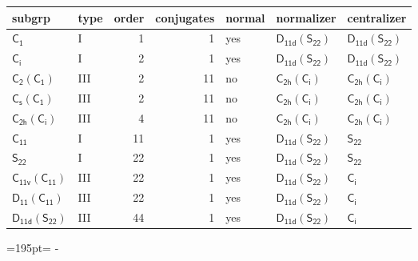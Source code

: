 \documentclass[10pt,a4paper]{article}
\newcommand{\needspace}[1]{\par\penalty-100\begingroup\dimen0=#1\relax\dimen2=\pagegoal
  \advance\dimen2-\pagetotal\ifdim\dimen0>\dimen2\relax\ifdim\dimen2>0pt\vfil\break\fi\fi
  \endgroup}
\numberwithin{equation}{section}
\newcommand{\grp}[1]{\mathsf{#1}}
\begin{document}
{\small\begin{longtable}{@{}llrrlll@{}}\toprule
subgrp & type & order & conjugates & normal & normalizer & centralizer\\\midrule\endhead
\bottomrule\endfoot\endlastfoot
\href{../../../rotation/data/pdf/C1.pdf}{$\grp{C_{1}}$} & I & 1 & 1 & yes & \href{D11d-S22.pdf}{$\grp{D_{11d}}(\grp{S_{22}})$} & \href{D11d-S22.pdf}{$\grp{D_{11d}}(\grp{S_{22}})$}\\*
\href{../../../rotation/data/pdf/S2.pdf}{$\grp{C_{i}}$} & I & 2 & 1 & yes & \href{D11d-S22.pdf}{$\grp{D_{11d}}(\grp{S_{22}})$} & \href{D11d-S22.pdf}{$\grp{D_{11d}}(\grp{S_{22}})$}\\*
\href{C2-C1.pdf}{$\grp{C_{2}}(\grp{C_{1}})$} & III & 2 & 11 & no & \href{C2h-S2.pdf}{$\grp{C_{2h}}(\grp{C_{i}})$} & \href{C2h-S2.pdf}{$\grp{C_{2h}}(\grp{C_{i}})$}\\*
\href{C1v-C1.pdf}{$\grp{C_{s}}(\grp{C_{1}})$} & III & 2 & 11 & no & \href{C2h-S2.pdf}{$\grp{C_{2h}}(\grp{C_{i}})$} & \href{C2h-S2.pdf}{$\grp{C_{2h}}(\grp{C_{i}})$}\\*
\href{C2h-S2.pdf}{$\grp{C_{2h}}(\grp{C_{i}})$} & III & 4 & 11 & no & \href{C2h-S2.pdf}{$\grp{C_{2h}}(\grp{C_{i}})$} & \href{C2h-S2.pdf}{$\grp{C_{2h}}(\grp{C_{i}})$}\\*
\href{../../../rotation/data/pdf/C11.pdf}{$\grp{C_{11}}$} & I & 11 & 1 & yes & \href{D11d-S22.pdf}{$\grp{D_{11d}}(\grp{S_{22}})$} & \href{../../../rotation/data/pdf/S22.pdf}{$\grp{S_{22}}$}\\*
\href{../../../rotation/data/pdf/S22.pdf}{$\grp{S_{22}}$} & I & 22 & 1 & yes & \href{D11d-S22.pdf}{$\grp{D_{11d}}(\grp{S_{22}})$} & \href{../../../rotation/data/pdf/S22.pdf}{$\grp{S_{22}}$}\\*
\href{C11v-C11.pdf}{$\grp{C_{11v}}(\grp{C_{11}})$} & III & 22 & 1 & yes & \href{D11d-S22.pdf}{$\grp{D_{11d}}(\grp{S_{22}})$} & \href{../../../rotation/data/pdf/S2.pdf}{$\grp{C_{i}}$}\\*
\href{D11-C11.pdf}{$\grp{D_{11}}(\grp{C_{11}})$} & III & 22 & 1 & yes & \href{D11d-S22.pdf}{$\grp{D_{11d}}(\grp{S_{22}})$} & \href{../../../rotation/data/pdf/S2.pdf}{$\grp{C_{i}}$}\\*
\href{D11d-S22.pdf}{$\grp{D_{11d}}(\grp{S_{22}})$} & III & 44 & 1 & yes & \href{D11d-S22.pdf}{$\grp{D_{11d}}(\grp{S_{22}})$} & \href{../../../rotation/data/pdf/S2.pdf}{$\grp{C_{i}}$}\\
\bottomrule\end{longtable}}
\needspace{195pt}
\end{document}
